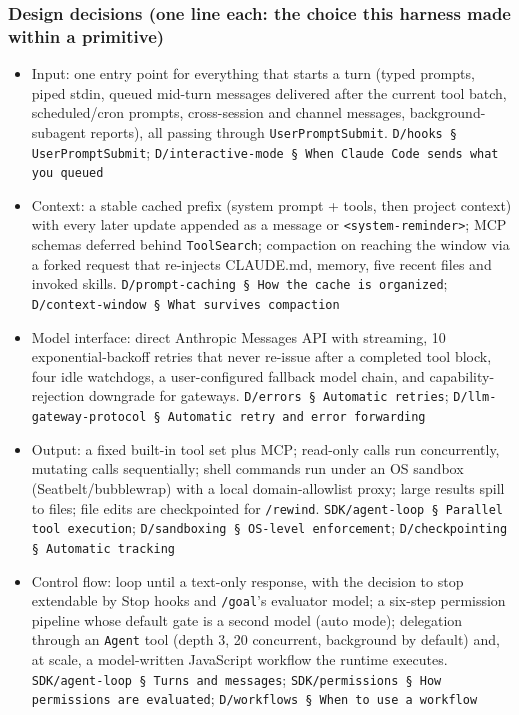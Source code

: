 \subsubsection*{Design decisions (one line each: the choice this harness made within a primitive)}
\begin{itemize}
\item Input: one entry point for everything that starts a turn (typed prompts, piped stdin, queued mid-turn messages delivered after the current tool batch, scheduled/cron prompts, cross-session and channel messages, background-subagent reports), all passing through \texttt{UserPromptSubmit}. \texttt{D/\allowbreak{}hooks § UserPromptSubmit}; \texttt{D/\allowbreak{}interactive-\allowbreak{}mode § When Claude Code sends what you queued}
\item Context: a stable cached prefix (system prompt + tools, then project context) with every later update appended as a message or \texttt{<system-\allowbreak{}reminder>}; MCP schemas deferred behind \texttt{ToolSearch}; compaction on reaching the window via a forked request that re-injects CLAUDE.md, memory, five recent files and invoked skills. \texttt{D/\allowbreak{}prompt-\allowbreak{}caching § How the cache is organized}; \texttt{D/\allowbreak{}context-\allowbreak{}window § What survives compaction}
\item Model interface: direct Anthropic Messages API with streaming, 10 exponential-backoff retries that never re-issue after a completed tool block, four idle watchdogs, a user-configured fallback model chain, and capability-rejection downgrade for gateways. \texttt{D/\allowbreak{}errors § Automatic retries}; \texttt{D/\allowbreak{}llm-\allowbreak{}gateway-\allowbreak{}protocol § Automatic retry and error forwarding}
\item Output: a fixed built-in tool set plus MCP; read-only calls run concurrently, mutating calls sequentially; shell commands run under an OS sandbox (Seatbelt/bubblewrap) with a local domain-allowlist proxy; large results spill to files; file edits are checkpointed for \texttt{/\allowbreak{}rewind}. \texttt{SDK/\allowbreak{}agent-\allowbreak{}loop § Parallel tool execution}; \texttt{D/\allowbreak{}sandboxing § OS-\allowbreak{}level enforcement}; \texttt{D/\allowbreak{}checkpointing § Automatic tracking}
\item Control flow: loop until a text-only response, with the decision to stop extendable by Stop hooks and \texttt{/\allowbreak{}goal}'s evaluator model; a six-step permission pipeline whose default gate is a second model (auto mode); delegation through an \texttt{Agent} tool (depth 3, 20 concurrent, background by default) and, at scale, a model-written JavaScript workflow the runtime executes. \texttt{SDK/\allowbreak{}agent-\allowbreak{}loop § Turns and messages}; \texttt{SDK/\allowbreak{}permissions § How permissions are evaluated}; \texttt{D/\allowbreak{}workflows § When to use a workflow}
\end{itemize}

